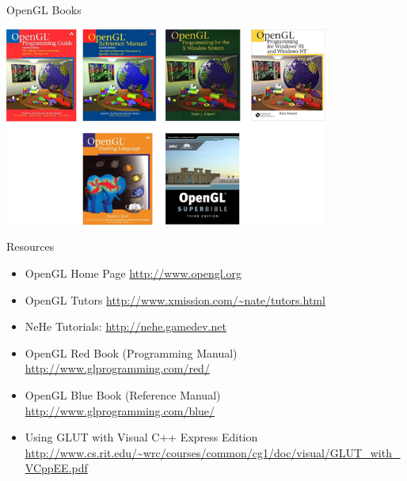 \documentclass[aspectratio=1610,xcolor=dvipsnames,t]{beamer}
\begin{document}
\begin{frame}{OpenGL Books} 
    \begin{center}
        \includegraphics[width=0.8\textwidth]{books} 
    \end{center}
\end{frame} 

\begin{frame}{Resources} 
    \begin{itemize} 
        \item OpenGL Home Page \url{http://www.opengl.org}
        \item OpenGL Tutors \url{http://www.xmission.com/~nate/tutors.html}
        \item NeHe Tutorials: \url{http://nehe.gamedev.net}
        \item OpenGL Red Book (Programming Manual) \url{http://www.glprogramming.com/red/}
        \item OpenGL Blue Book (Reference Manual) \url{http://www.glprogramming.com/blue/}
        \item Using GLUT with Visual C++ Express Edition 
              \url{http://www.cs.rit.edu/~wrc/courses/common/cg1/doc/visual/GLUT_with_VCppEE.pdf}
    \end{itemize}
\end{frame} 
\end{document}
